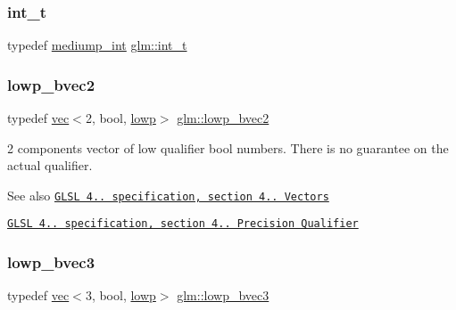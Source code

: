 \subsubsection{\texorpdfstring{int\+\_\+t}{int\_t}}
{\footnotesize\ttfamily typedef \mbox{\hyperlink{group__core__precision_ga2a3dcbcd7f4e17663d393a12061ac6ac}{mediump\+\_\+int}} \mbox{\hyperlink{group__core__precision_gacd01d170508f812968875b0f2e730e8c}{glm\+::int\+\_\+t}}}

\mbox{\label{group__core__precision_ga5529a08a5bb9e851a582f7c4cfa74ba0}} 
\subsubsection{\texorpdfstring{lowp\+\_\+bvec2}{lowp\_bvec2}}
{\footnotesize\ttfamily typedef \mbox{\hyperlink{structglm_1_1vec}{vec}}$<$2, bool, \mbox{\hyperlink{namespaceglm_a36ed105b07c7746804d7fdc7cc90ff25ae161af3fc695e696ce3bf69f7332bc2d}{lowp}}$>$ \mbox{\hyperlink{group__core__precision_ga5529a08a5bb9e851a582f7c4cfa74ba0}{glm\+::lowp\+\_\+bvec2}}}

2 components vector of low qualifier bool numbers. There is no guarantee on the actual qualifier.

\begin{DoxySeeAlso}{See also}
\href{http://www.opengl.org/registry/doc/GLSLangSpec.4.20.8.pdf}{\tt G\+L\+SL 4.. specification, section 4.. Vectors} 

\href{http://www.opengl.org/registry/doc/GLSLangSpec.4.20.8.pdf}{\tt G\+L\+SL 4.. specification, section 4.. Precision Qualifier} 
\end{DoxySeeAlso}
\mbox{\label{group__core__precision_gad68503417ddfd296669e9af59f3e0d1c}} 
\subsubsection{\texorpdfstring{lowp\+\_\+bvec3}{lowp\_bvec3}}
{\footnotesize\ttfamily typedef \mbox{\hyperlink{structglm_1_1vec}{vec}}$<$3, bool, \mbox{\hyperlink{namespaceglm_a36ed105b07c7746804d7fdc7cc90ff25ae161af3fc695e696ce3bf69f7332bc2d}{lowp}}$>$ \mbox{\hyperlink{group__core__precision_gad68503417ddfd296669e9af59f3e0d1c}{glm\+::lowp\+\_\+bvec3}}}

